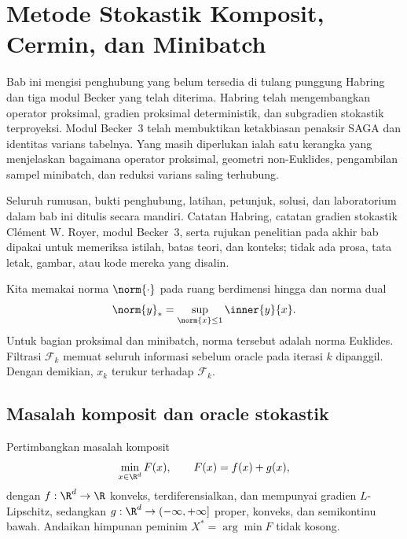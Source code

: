 \chapter{Metode Stokastik Komposit, Cermin, dan Minibatch}
\label{orig01:chapter:stochastic-composite}

Bab ini mengisi penghubung yang belum tersedia di tulang punggung Habring
dan tiga modul Becker yang telah diterima. Habring telah mengembangkan
operator proksimal, gradien proksimal deterministik, dan subgradien stokastik
terproyeksi. Modul Becker~3 telah membuktikan ketakbiasan penaksir SAGA dan
identitas varians tabelnya. Yang masih diperlukan ialah satu kerangka yang
menjelaskan bagaimana operator proksimal, geometri non-Euklides, pengambilan
sampel minibatch, dan reduksi varians saling terhubung.

Seluruh rumusan, bukti penghubung, latihan, petunjuk, solusi, dan laboratorium
dalam bab ini ditulis secara mandiri. Catatan Habring, catatan gradien
stokastik Cl\'ement W. Royer, modul Becker~3, serta rujukan penelitian pada
akhir bab dipakai untuk memeriksa istilah, batas teori, dan konteks; tidak ada
prosa, tata letak, gambar, atau kode mereka yang disalin.

Kita memakai norma $\norm{\cdot}$ pada ruang berdimensi hingga dan norma
dual
\begin{equation}
  \norm{y}_*=\sup_{\norm{x}\leq1}\inner{y}{x}.
\end{equation}
Untuk bagian proksimal dan minibatch, norma tersebut adalah norma Euklides.
Filtrasi $\mathcal F_k$ memuat seluruh informasi sebelum oracle pada iterasi
$k$ dipanggil. Dengan demikian, $x_k$ terukur terhadap $\mathcal F_k$.

\section{Masalah komposit dan oracle stokastik}
\label{orig01:section:model}

Pertimbangkan masalah komposit
\begin{equation}
  \label{orig01:eq:composite-problem}
  \min_{x\in\R^d} F(x),
  \qquad F(x)=f(x)+g(x),
\end{equation}
dengan $f:\R^d\to\R$ konveks, terdiferensialkan, dan mempunyai gradien
$L$-Lipschitz, sedangkan $g:\R^d\to(-\infty,+\infty]$ proper, konveks, dan
semikontinu bawah. Andaikan himpunan peminim $X^*=\arg\min F$ tidak kosong.

